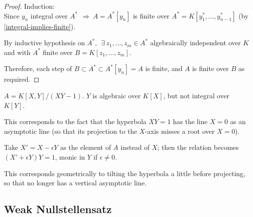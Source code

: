 \documentclass{article}
\theoremstyle{definition}
\newenvironment{eg}[1]
{\renewcommand\theinnereg{#1}\innereg}
{\endinnereg}
\begin{document}
\begin{proof}
  \vspace{0.3cm}
  Induction:\\
  Since $y_n$ integral over $A^* ~~\Longrightarrow~ A=A^*[y_n]$ is finite over $A^*=K[y_1^*, \ldots, y_{n-1}^*]$ (by \ref{integral-implies-finite}).

  By inductive hypothesis on $A^*,~~ \exists~ z_1, \ldots, z_m \in A^*$ algebraically independent over $K$ and with $A^*$ finite over $B=K[z_1, \ldots, z_m]$.

  Therefore, each step of $B \subset A^* \subset A^*[y_n]=A$ is finite, and $A$ is finite over $B$ as required.
\end{proof}


\vspace{0.5cm}
\begin{eg}{ }
  $A = K[X,Y]/(XY-1)$. $Y$ is algebraic over $K[X]$, but not integral over $K[Y]$.

  This corresponds to the fact that the hyperbola $XY=1$ has the line $X=0$ as an asymptotic line (so that its projection to the $X$-axis misses a root over $X=0$).

  Take $X' = X- \epsilon Y$ as the element of $A$ instead of $X$; then the relation becomes $(X' + \epsilon Y) Y=1$, monic in $Y$ if $\epsilon \neq 0$.

  This corresponds geometrically to tilting the hyperbola a little before projecting, so that no longer has a vertical asymptotic line.
\end{eg}

\vspace{1cm}

\subsection{Weak Nullstellensatz}
\end{document}

